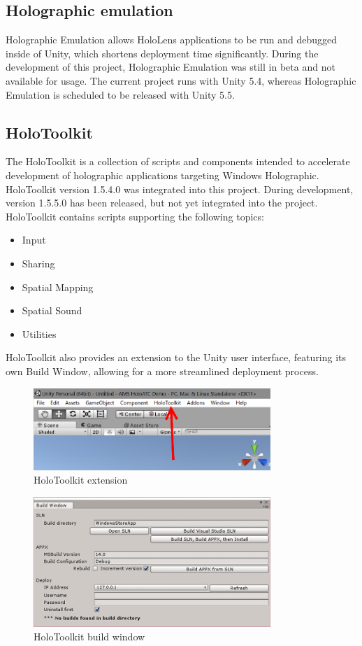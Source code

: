 \subsection{Holographic emulation}
Holographic Emulation allows HoloLens applications to be run and debugged inside of Unity, which shortens deployment time significantly. During the development of this project, Holographic Emulation was still in beta and not available for usage. The current project runs with Unity 5.4, whereas Holographic Emulation is scheduled to be released with Unity 5.5.

\subsection{HoloToolkit}
The HoloToolkit is a collection of scripts and components intended to accelerate development of holographic applications targeting Windows Holographic. HoloToolkit version 1.5.4.0 was integrated into this project. During development, version 1.5.5.0 has been released, but not yet integrated into the project. HoloToolkit contains scripts supporting the following topics:
\begin{itemize}
\item Input
\item Sharing
\item Spatial Mapping
\item Spatial Sound
\item Utilities
\end{itemize}
HoloToolkit also provides an extension to the Unity user interface, featuring its own Build Window, allowing for a more streamlined deployment process.

\begin{figure}[H]
  \centering
  \includegraphics[width=0.8\textwidth]{images/HoloToolkitExtension.png}
  \caption{HoloToolkit extension}
\end{figure} 

\begin{figure}[H]
  \centering
  \includegraphics[width=0.8\textwidth]{images/HoloToolkitBuildWindow.png}
  \caption{HoloToolkit build window}
\end{figure} 







